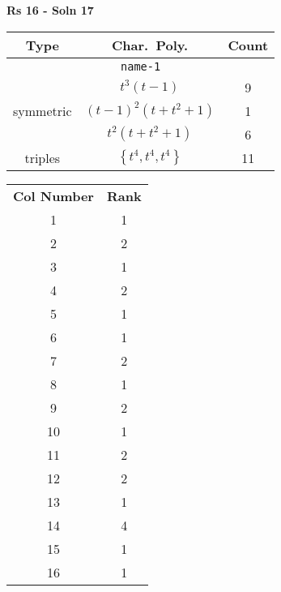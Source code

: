 \documentclass{article}
\begin{document}
    \textbf{Rs 16 - Soln 17}
    \begin{table}
    \begin{tabular}{|c|c|c|}
    \hline
    \textbf{Type} & \textbf{Char.~Poly.} & \textbf{Count} \\
    \hline \multicolumn{3}{|c|}{\texttt{name-1}} \\ \hline
    \multirow{3}{*}{symmetric}
    & $t^3(t - 1)$ & 9 \\
    & $(t - 1)^2(t + t^2 + 1)$ & 1 \\
    & $t^2(t + t^2 + 1)$ & 6 \\
    \hline
    \multirow{1}{*}{triples}
    & $\left\{t^4,t^4,t^4\right\}$ & 11 \\
    \hline
    \end{tabular}
    \end{table}
    \begin{table}
    \begin{tabular}{|c|c|}
    \hline
    \textbf{Col Number} & \textbf{Rank}\\
    1 & 1 \\ 
    2 & 2 \\ 
    3 & 1 \\ 
    4 & 2 \\ 
    5 & 1 \\ 
    6 & 1 \\ 
    7 & 2 \\ 
    8 & 1 \\ 
    9 & 2 \\ 
    10 & 1 \\ 
    11 & 2 \\ 
    12 & 2 \\ 
    13 & 1 \\ 
    14 & 4 \\ 
    15 & 1 \\ 
    16 & 1 \\ 
    \hline
    \end{tabular}
    \end{table}
    \newpage
\end{document}
